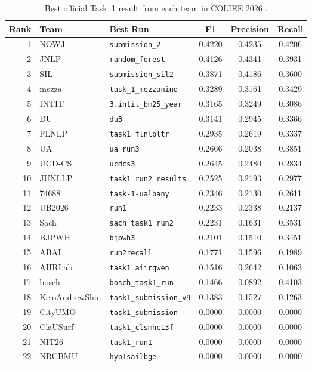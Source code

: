 \begin{table}[t]
  \centering
  \scriptsize
  \begin{tabular}{rllccc}
    \toprule
    Rank & Team & Best Run & F1 & Precision & Recall \\
    \midrule
    1 & NOWJ & \texttt{submission\_2} & 0.4220 & 0.4235 & 0.4206 \\
    2 & JNLP & \texttt{random\_forest} & 0.4126 & 0.4341 & 0.3931 \\
    3 & SIL & \texttt{submission\_sil2} & 0.3871 & 0.4186 & 0.3600 \\
    4 & mezza & \texttt{task\_1\_mezzanino} & 0.3289 & 0.3161 & 0.3429 \\
    5 & INTIT & \texttt{3.intit\_bm25\_year} & 0.3165 & 0.3249 & 0.3086 \\
    6 & DU & \texttt{du3} & 0.3141 & 0.2945 & 0.3366 \\
    7 & FLNLP & \texttt{task1\_flnlpltr} & 0.2935 & 0.2619 & 0.3337 \\
    8 & UA & \texttt{ua\_run3} & 0.2666 & 0.2038 & 0.3851 \\
    9 & UCD-CS & \texttt{ucdcs3} & 0.2645 & 0.2480 & 0.2834 \\
    10 & JUNLLP & \texttt{task1\_run2\_results} & 0.2525 & 0.2193 & 0.2977 \\
    11 & 74688 & \texttt{task-1-ualbany} & 0.2346 & 0.2130 & 0.2611 \\
    12 & UB2026 & \texttt{run1} & 0.2233 & 0.2338 & 0.2137 \\
    13 & Sach & \texttt{sach\_task1\_run2} & 0.2231 & 0.1631 & 0.3531 \\
    14 & BJPWH & \texttt{bjpwh3} & 0.2101 & 0.1510 & 0.3451 \\
    15 & ABAI & \texttt{run2recall} & 0.1771 & 0.1596 & 0.1989 \\
    16 & AIIRLab & \texttt{task1\_aiirqwen} & 0.1516 & 0.2642 & 0.1063 \\
    17 & bosch & \texttt{bosch\_task1\_run} & 0.1466 & 0.0892 & 0.4103 \\
    18 & KeioAndrewShin & \texttt{task1\_submission\_v9} & 0.1383 & 0.1527 & 0.1263 \\
    19 & CityUMO & \texttt{task1\_submission} & 0.0000 & 0.0000 & 0.0000 \\
    20 & ClaUSurf & \texttt{task1\_clsmhc13f} & 0.0000 & 0.0000 & 0.0000 \\
    21 & NIT26 & \texttt{task1\_run1} & 0.0000 & 0.0000 & 0.0000 \\
    22 & NRCBMU & \texttt{hyb1sailbge} & 0.0000 & 0.0000 & 0.0000 \\
    \bottomrule
  \end{tabular}
  \caption{Best official Task~1 result from each team in COLIEE 2026 \cite{coliee2026task1results}.}
  \label{tab:official-ranking}
\end{table}


